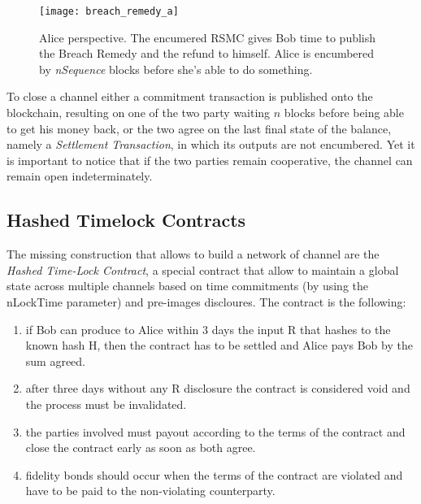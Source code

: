 		\begin{figure}
			\centering
			\texttt{[image: breach\_remedy\_a]}
			\caption{Alice perspective. The encumered RSMC gives Bob time to publish the Breach Remedy and the refund to himself. Alice is encumbered by \textit{nSequence} blocks before she's able to do something.}
		\end{figure}
				
		To close a channel either a commitment transaction is published onto the blockchain, resulting on one of the two party waiting \(n\) blocks before being able to get his money back, or the two agree on the last final state of the balance, namely a \textit{Settlement Transaction}, in which its outputs are not encumbered. Yet it is important to notice that if the two parties remain cooperative, the channel can remain open indeterminately.
		
		\subsection{Hashed Timelock Contracts}
		
		The missing construction that allows to build a network of channel are the \textit{Hashed Time-Lock Contract}, a special contract that allow to maintain a global state across multiple channels based on time commitments (by using the nLockTime parameter) and pre-images discloures.
		The contract is the following:
		\begin{enumerate}
			\item if Bob can produce to Alice within 3 days the input R that hashes to the known hash H, then the contract has to be settled and Alice pays Bob by the sum agreed.
			
			\item after three days without any R disclosure the contract is considered void and the process must be invalidated.
			
			\item the parties involved must payout according to the terms of the contract and close the contract early as soon as both agree.
			
			\item fidelity bonds should occur when the terms of the contract are violated and have to be paid to the non-violating counterparty.
		\end{enumerate}
	
